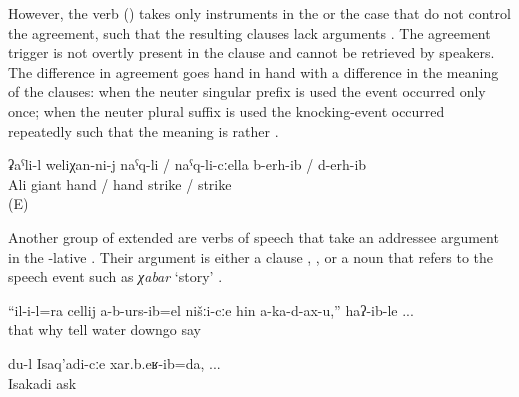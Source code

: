 However, the verb  ()  takes only instruments in the  or the  case that do not control the agreement, such that the resulting clauses lack  arguments . The agreement trigger is not overtly present in the clause and cannot be retrieved by speakers. The difference in  agreement goes hand in hand with a difference in the meaning of the clauses: when the neuter singular prefix  is used the event occurred only once; when the neuter plural suffix is used the knocking-event occurred repeatedly such that the meaning is rather .
%
\begin{exe}
	\ex	\label{ex:‎‎‎Ali knocked / beat off the giant with the hand}
	\gll	ʡaˁli-l	weliχan-ni-j	naˁq-li	/	naˁq-li-cːella b-erh-ib	/	d-erh-ib\\
		Ali	giant	hand / hand	strike	/	strike\\
	\glt	{} (E)
\end{exe}

Another group of extended  are verbs of speech that take an addressee argument in the -lative . Their  argument is either a clause , , or a noun that refers to the speech event such as \textit{χabar} `story' .

%
\begin{exe}
	\ex	\label{ex:verbs of speech addressees}
	\begin{xlist}
		\ex	{} 
		\ex	{} 		
		\ex	{} 
	\end{xlist}

	\ex	\label{ex:Why did he not tell us that the water does not flow, they said}
	\gll	``il-i-l=ra	cellij	a-b-urs-ib=el	nišːi-cːe	hin	a-ka-d-ax-u,''	haʔ-ib-le ...\\
		that	why	tell		water	downgo	say\\
	\glt	{}

	\ex	\label{ex:I asked Isakadi}
	\gll	du-l	Isaq'adi-cːe	xar.b.eʁ-ib=da, ...\\
			Isakadi	ask\\
	\glt	{}
\end{exe}

